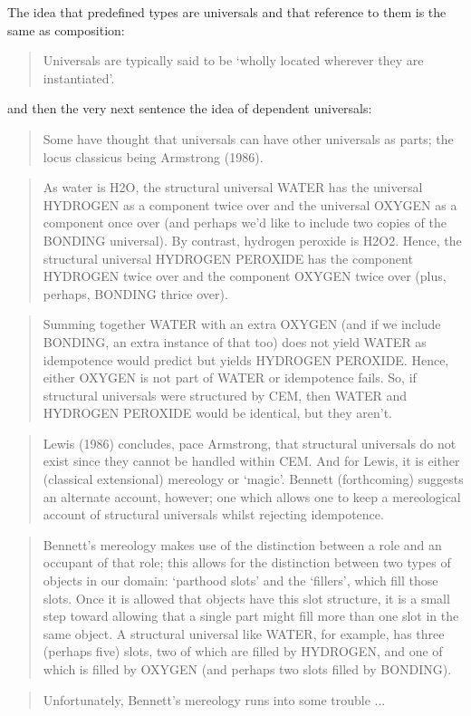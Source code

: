 \documentclass[11pt,a4paper]{scrartcl}
\begin{document}
The idea that predefined types are universals and that reference to them is the same as composition:
\begin{quote}
Universals are typically said to be ‘wholly located wherever they are instantiated’.
\end{quote}
and then the very next sentence the idea of dependent universals:
\begin{quote}
Some have thought that universals can have other universals as parts; the locus classicus being
Armstrong (1986).
\end{quote}


\begin{quote}
As water is H2O, the structural universal WATER has the universal HYDROGEN as a
component twice over and the universal OXYGEN as a component once over (and perhaps
we’d like to include two copies of the BONDING universal). By contrast, hydrogen peroxide
is H2O2. Hence, the structural universal HYDROGEN PEROXIDE has the component
HYDROGEN twice over and the component OXYGEN twice over (plus, perhaps, BONDING
thrice over).
\end{quote}
\begin{quote}
Summing together WATER with an extra OXYGEN (and if we include BONDING, an extra
instance of that too) does not yield WATER as idempotence would predict but yields
HYDROGEN PEROXIDE. Hence, either OXYGEN is not part of WATER or idempotence fails.
So, if structural universals were structured by CEM, then WATER and HYDROGEN PEROXIDE
would be identical, but they aren’t.
\end{quote}
\begin{quote}
Lewis (1986) concludes, pace Armstrong, that structural universals do not exist since they
cannot be handled within CEM. And for Lewis, it is either (classical extensional) mereology
or ‘magic’. Bennett (forthcoming) suggests an alternate account, however; one which allows
one to keep a mereological account of structural universals whilst rejecting idempotence.
\end{quote}
\begin{quote}
Bennett’s mereology makes use of the distinction between a role and an occupant of that
role; this allows for the distinction between two types of objects in our domain: ‘parthood
slots’ and the ‘fillers’, which fill those slots. Once it is allowed that objects have this slot structure, it is a small step toward allowing that a single part might fill more than one slot in the
same object. A structural universal like WATER, for example, has three (perhaps five) slots,
two of which are filled by HYDROGEN, and one of which is filled by OXYGEN (and perhaps
two slots filled by BONDING).
\end{quote}
\begin{quote}
Unfortunately, Bennett’s mereology runs into some trouble ...
\end{quote}
\end{document}

